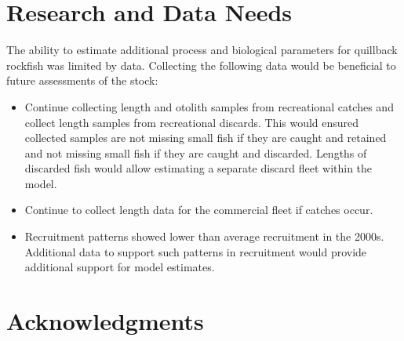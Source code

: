 \documentclass[11pt,
  english,
  letterpaper,
]{article}
\begin{document}
\leavevmode\tagmcend\tagstructend\par


\hypertarget{research-and-data-needs}{%
\section{Research and Data Needs}\label{research-and-data-needs}}

\leavevmode\tagmcend\tagstructend


The ability to estimate additional process and biological parameters for quillback rockfish was limited by data. Collecting the following data would be beneficial to future assessments of the stock:

\leavevmode\tagmcend\tagstructend\par

\begin{itemize}

    \item Continue collecting length and otolith samples from recreational catches and collect length samples from recreational discards. This would ensured collected samples are not missing small fish if they are caught and retained and not missing small fish if they are caught and discarded. Lengths of discarded fish would allow estimating a separate discard fleet within the model.   

    \item Continue to collect length data for the commercial fleet if catches occur.
    
    \item Recruitment patterns showed lower than average recruitment in the 2000s. Additional data to support such patterns in recruitment would provide additional support for model estimates.  

\end{itemize}


\hypertarget{acknowledgments}{%
\section{Acknowledgments}\label{acknowledgments}}

\leavevmode\tagmcend\tagstructend

\end{document}
